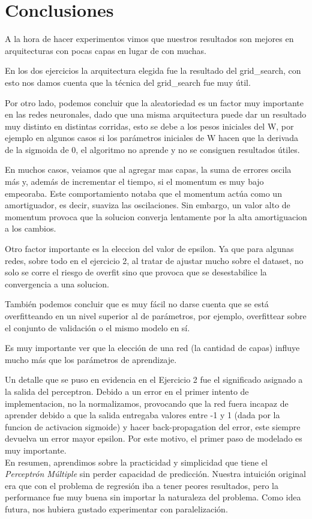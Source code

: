 \section{Conclusiones}
A la hora de hacer experimentos vimos que nuestros resultados son mejores en arquitecturas con pocas capas en lugar de con muchas.

En los dos ejercicios la arquitectura elegida fue la resultado del grid\_search, con esto nos damos cuenta que la técnica del grid\_search fue muy útil.

Por otro lado, podemos concluir que la aleatoriedad es un factor muy importante en las redes neuronales, dado que una misma arquitectura puede dar un resultado muy distinto en distintas corridas, esto se debe a los pesos iniciales del W, por ejemplo en algunos casos si los parámetros iniciales de W hacen que la derivada de la sigmoida de 0, el algoritmo no aprende y no se consiguen resultados útiles.

En muchos casos, veiamos que al agregar mas capas, la suma de errores oscila más y, además de incrementar el tiempo, si el momentum es muy bajo empeoraba. Este comportamiento notaba que el momentum actúa como un amortiguador, es decir, suaviza las oscilaciones. Sin embargo, un valor alto de momentum provoca que la solucion converja lentamente por la alta amortiguacion a los cambios.

Otro factor importante es la eleccion del valor de epsilon. Ya que para algunas redes, sobre todo en el ejercicio 2, al tratar de ajustar mucho sobre el dataset, no solo se corre el riesgo de overfit sino que provoca que se desestabilice la convergencia a una solucion.

También podemos concluir que es muy fácil no darse cuenta que se está overfitteando en un nivel superior al de parámetros, por ejemplo, overfittear sobre el conjunto de validación o el mismo modelo en sí.

Es muy importante ver que la elección de una red (la cantidad de capas) influye mucho más que los parámetros de aprendizaje.

Un detalle que se puso en evidencia en el Ejercicio 2 fue el significado asignado a la salida del perceptron. Debido a un error en el primer intento de implementacion, no la normalizamos, provocando que la red fuera incapaz de aprender debido a que la salida entregaba valores entre -1 y 1 (dada por la funcion de activacion sigmoide) y hacer back-propagation del error, este siempre devuelva un error mayor epsilon. Por este motivo, el primer paso de modelado es muy importante.
\\

En resumen, aprendimos sobre la practicidad y simplicidad que tiene el \textit{Perceptrón Múltiple} sin perder capacidad de predicción. Nuestra intuición original era que con el problema de regresión iba a tener peores resultados, pero la performance fue muy buena sin importar la naturaleza del problema. Como idea futura, nos hubiera gustado experimentar con paralelización.
